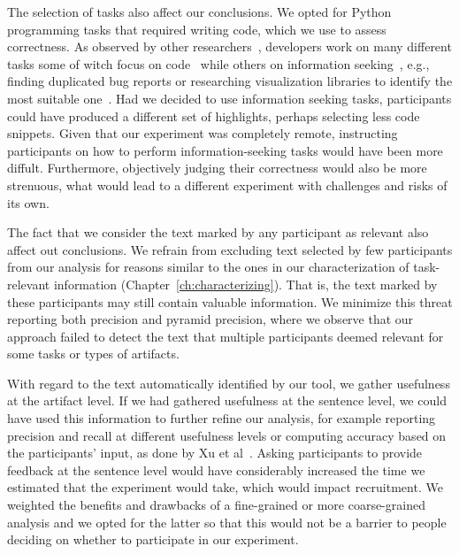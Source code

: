 The selection of tasks also affect our conclusions. We opted for Python programming tasks that 
required writing code, which we use to assess correctness. 
As observed by other researchers~\cite{satterfield2020, meyer2020}, developers
work on many different tasks some of witch focus on code~\cite{Meyer2017}
while others on information seeking~\cite{gonccalves2011}, e.g., finding duplicated bug reports or researching visualization libraries to identify the most suitable one~\cite{satterfield2020}.
Had we decided to use information seeking tasks, participants could have produced a different set of highlights,
perhaps selecting less code snippets. 
Given that 
our experiment was completely remote, instructing participants on how to perform information-seeking 
tasks would have been more diffult. Furthermore, objectively judging their correctness 
would also be more strenuous, what would lead to a different experiment with challenges and risks of its own.




The fact that we consider the text marked by any participant as relevant 
also affect out conclusions. 
We refrain from excluding text selected by few participants from our analysis 
for reasons similar to the ones in our characterization of task-relevant information (Chapter~\ref{ch:characterizing}). That is, the text marked by these participants may still contain valuable information. 
We minimize this threat reporting both precision and pyramid precision, where we observe that 
our approach failed to detect the text that multiple participants deemed relevant
for some tasks or types of artifacts. 



With regard to the text automatically identified by our tool, we gather usefulness at the artifact level.
If we had gathered usefulness at the sentence level, we could have used this information 
to further refine our analysis, for example reporting precision and recall 
at different usefulness levels or computing accuracy based on the participants' input, as done by Xu et al~\cite{Xu2017}. %
Asking participants to provide feedback at the sentence level would have considerably increased the time we estimated that the experiment would take,
which would impact recruitment. We weighted the benefits and drawbacks of a fine-grained or more coarse-grained 
analysis and we opted for the latter so that this would not be a barrier to people deciding on 
whether to participate in our experiment.